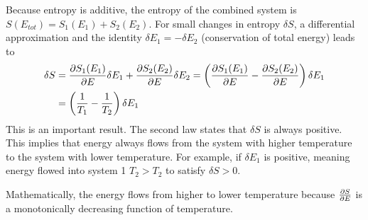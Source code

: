 \documentclass[11pt, a4paper]{article}
\begin{document}
\begin{itemize}
	Because entropy is additive, the entropy of the combined system is $ S(E_{tot}) = S_{1}(E_{1}) + S_{2}(E_{2}) $. For small changes in entropy $ \delta S $, a differential approximation and the identity $ \delta E_{1} = -\delta E_{2}  $ (conservation of total energy) leads to
	\begin{align*}
		\delta S &= \pdv{S_{1}(E_{1})}{E}\delta E_{1} + \pdv{S_{2}(E_{2})}{E}\delta E_{2} = \left( \pdv{S_{1}(E_{1})}{E} - \pdv{S_{2}(E_{2})}{E} \right)\delta E_{1}\\
		&=\left(\frac{1}{T_{1}} - \frac{1}{T_{2}}\right) \delta E_{1}
	\end{align*}
	This is an important result. The second law states that $ \delta S $ is always positive. This implies that energy always flows from the system with higher temperature to the system with lower temperature. For example, if $ \delta E_{1} $ is positive, meaning energy flowed into system 1 $ T_{2} > T_{2} $ to satisfy $ \delta S > 0 $.
	
	Mathematically, the energy flows from higher to lower temperature because $ \pdv{S}{E} $ is a monotonically decreasing function of temperature.
\end{itemize}
\end{document}

